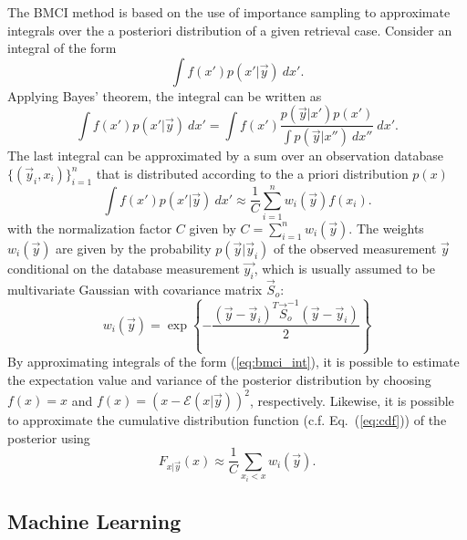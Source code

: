 \documentclass[journal abbreviation, manuscript]{copernicus}
\begin{document}
    The BMCI method is based on the use of importance sampling to approximate
    integrals over the a posteriori distribution of a given retrieval case. Consider an
    integral of the form
    \begin{equation}\label{eq:bmci_int}
     \int f(x') p(x'|\vec{y}) \: dx'.
    \end{equation}
    Applying Bayes' theorem, the integral can be written as
    \begin{equation*}
    \int f(x') p(x' | \vec{y}) \: dx' =
    \int f(x') \frac{p(\vec{y} | x')p(x')}
                    {\int p(\vec{y} | x'') \: dx''} \: dx'.
    \end{equation*}
    The last integral can be approximated by a sum over an observation
    database $\{(\vec{y}_i, x_i)\}_{i = 1}^n$ that is distributed according
    to the a priori distribution $p(x)$
    \begin{equation*}
    \int f(x') p(x' | \vec{y}) \: dx'  \approx \frac{1}{C}  \sum_{i = 1}^n w_i(\vec{y}) f(x_i).
    \end{equation*}
    with the normalization factor $C$ given by $C = \sum_{i = 1}^n w_i(\vec{y}).$
    The weights $w_i(\vec{y})$ are given by  the probability $p(\vec{y} | \vec{y}_i)$
    of the observed measurement $\vec{y}$ conditional on the database
    measurement $\vec{y_i}$, which is usually assumed to be multivariate
    Gaussian with covariance matrix $\vec{S}_o$:
    \begin{equation*}
    w_i(\vec{y}) = \exp \left \{- \frac{(\vec{y} - \vec{y}_i)^T \vec{S}_o^{-1}
                                       (\vec{y} - \vec{y}_i)}{2} \right \}
    \end{equation*}
     By approximating integrals of the form (\ref{eq:bmci_int}), it is possible
    to estimate the expectation value and variance of the posterior distribution by
    choosing $f(x) = x$ and $f(x) = (x - \mathcal{E}(x | \vec{y}))^2$, respectively.
    Likewise, it is possible to approximate the cumulative distribution function
    (c.f. Eq.~(\ref{eq:cdf})) of the posterior using
    \begin{equation}
    \label{eq:cdf}
    F_{x | \vec{y}}(x) \approx \frac{1}{C} \sum_{x_i < x} w_i(\vec{y}).
    \end{equation}

\subsection{Machine Learning}
\end{document}
